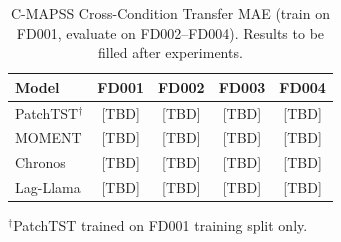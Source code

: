 \begin{table}[htbp]
\caption{C-MAPSS Cross-Condition Transfer MAE (train on FD001, evaluate on FD002--FD004).
Results to be filled after experiments.}
\label{tab:rul}
\centering
\begin{tabular}{lcccc}
\toprule
Model & FD001 & FD002 & FD003 & FD004 \\
\midrule
PatchTST$^{\dagger}$ & [TBD] & [TBD] & [TBD] & [TBD] \\
MOMENT & [TBD] & [TBD] & [TBD] & [TBD] \\
Chronos & [TBD] & [TBD] & [TBD] & [TBD] \\
Lag-Llama & [TBD] & [TBD] & [TBD] & [TBD] \\
\bottomrule
\end{tabular}
\vspace{2pt}
\footnotesize{$^{\dagger}$PatchTST trained on FD001 training split only.}
\end{table}
